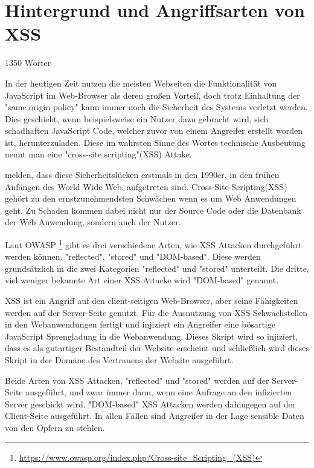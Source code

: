 \section{Hintergrund und Angriffsarten von XSS}
\label{section:Hintergrund} 1350 Wörter




In der heutigen Zeit nutzen die meisten Webseiten die Funktionalität von JavaScript im Web-Browser als deren großen Vorteil, doch trotz Einhaltung der "same origin policy" kann immer noch die Sicherheit des Systems verletzt werden. Dies geschieht, wenn beispielsweise ein Nutzer dazu gebracht wird, sich schadhaften JavaScript Code, welcher zuvor von einem Angreifer erstellt worden ist, herunterzuladen. Diese im wahrsten Sinne des Wortes technische Ausbeutung nennt man eine "cross-site scripting"(XSS) Attake.\autocite[2]{kirda2009}


\textcite[2]{hydara2015a} melden, dass diese Sicherheitslücken erstmals in den 1990er, in den frühen Anfängen des World Wide Web, aufgetreten sind. Cross-Site-Scripting(XSS) gehört zu den ernstzunehmendsten Schwächen wenn es um Web Anwendungen geht. Zu Schaden kommen dabei nicht nur der Source Code oder die Datenbank der Web Anwendung, sondern auch der Nutzer.

Laut OWASP \footnote{\url{https://www.owasp.org/index.php/Cross-site_Scripting_(XSS)}} gibt es drei verschiedene Arten, wie XSS Attacken durchgeführt werden können. "reflected", "stored" und "DOM-based". Diese werden grundsätzlich in die zwei Kategorien "reflected" und "stored" unterteilt. Die dritte, viel weniger bekannte Art einer XSS Attacke wird "DOM-based" genannt.

XSS ist ein Angriff auf den client-seitigen Web-Browser, aber seine Fähigkeiten werden auf der Server-Seite genutzt. Für die Ausnutzung von XSS-Schwachstellen in den Webanwendungen fertigt und injiziert ein Angreifer eine bösartige JavaScript Sprengladung in die Webanwendung. Dieses Skript wird so injiziert, dass es als gutartiger Bestandteil der Website erscheint und schließlich wird dieses Skript in der Domäne des Vertrauens der Website ausgeführt.\autocite[4]{gupta2017}


Beide Arten von XSS Attacken, "reflected" und "stored" werden auf der Server-Seite ausgeführt, und zwar immer dann, wenn eine Anfrage an den infizierten Server geschickt wird. "DOM-based" XSS Attacken werden dahingegen auf der Client-Seite ausgeführt. In allen Fällen sind Angreifer in der Lage sensible Daten von den Opfern zu stehlen.\autocite[2]{hydara2015a}

